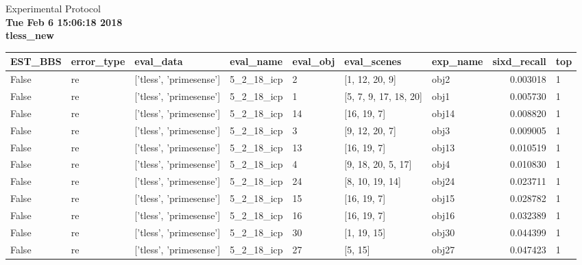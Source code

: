 \documentclass[a4paper,table]{article}
\begin{document}
\begin{center}
{\Huge Experimental Protocol}\\
\textbf{Tue Feb  6 15:06:18 2018}\\
\textbf{tless\_new}\\
\end{center}
\begin{adjustbox}{max width=\textwidth}\begin{tabular}{lllllllrl}
\toprule
 EST\_BBS & error\_type &                eval\_data &   eval\_name & eval\_obj &            eval\_scenes & exp\_name &  sixd\_recall & top \\
\midrule
   False &         re &  ['tless', 'primesense'] &  5\_2\_18\_icp &        2 &         [1, 12, 20, 9] &     obj2 &     0.003018 &   1 \\
   False &         re &  ['tless', 'primesense'] &  5\_2\_18\_icp &        1 &  [5, 7, 9, 17, 18, 20] &     obj1 &     0.005730 &   1 \\
   False &         re &  ['tless', 'primesense'] &  5\_2\_18\_icp &       14 &            [16, 19, 7] &    obj14 &     0.008820 &   1 \\
   False &         re &  ['tless', 'primesense'] &  5\_2\_18\_icp &        3 &         [9, 12, 20, 7] &     obj3 &     0.009005 &   1 \\
   False &         re &  ['tless', 'primesense'] &  5\_2\_18\_icp &       13 &            [16, 19, 7] &    obj13 &     0.010519 &   1 \\
   False &         re &  ['tless', 'primesense'] &  5\_2\_18\_icp &        4 &     [9, 18, 20, 5, 17] &     obj4 &     0.010830 &   1 \\
   False &         re &  ['tless', 'primesense'] &  5\_2\_18\_icp &       24 &        [8, 10, 19, 14] &    obj24 &     0.023711 &   1 \\
   False &         re &  ['tless', 'primesense'] &  5\_2\_18\_icp &       15 &            [16, 19, 7] &    obj15 &     0.028782 &   1 \\
   False &         re &  ['tless', 'primesense'] &  5\_2\_18\_icp &       16 &            [16, 19, 7] &    obj16 &     0.032389 &   1 \\
   False &         re &  ['tless', 'primesense'] &  5\_2\_18\_icp &       30 &            [1, 19, 15] &    obj30 &     0.044399 &   1 \\
   False &         re &  ['tless', 'primesense'] &  5\_2\_18\_icp &       27 &                [5, 15] &    obj27 &     0.047423 &   1 \\

\end{tabular}
\end{adjustbox}
\end{document}
